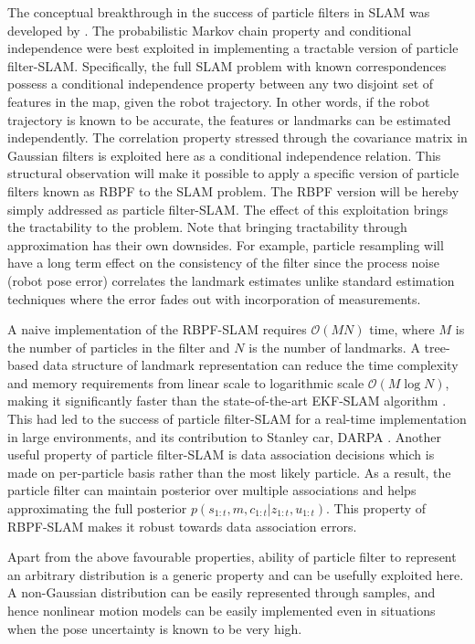 The conceptual breakthrough in the success of particle filters in SLAM was developed by \cite{montemerlo2002fastslam}. The probabilistic Markov chain property and conditional independence were best exploited in implementing a tractable version of particle filter-SLAM. Specifically, the full SLAM problem with known correspondences possess a conditional independence property between any two disjoint set of features in the map, given the robot trajectory. In other words, if the robot trajectory is known to be accurate, the features or landmarks can be estimated independently. The correlation property stressed through the covariance matrix in Gaussian filters is exploited here as a conditional independence relation. This structural observation will make it possible to apply a specific version of particle filters known as \acf{RBPF} to the SLAM problem. The RBPF version will be hereby simply addressed as particle filter-SLAM. The effect of this exploitation brings the tractability to the problem. Note that bringing tractability through approximation has their own downsides. For example, particle resampling will have a long term effect on the consistency of the filter \cite{bailey2006consistency} since the process noise (robot pose error) correlates the landmark estimates unlike standard estimation techniques where the error fades out with incorporation of measurements.

A naive implementation of the RBPF-SLAM requires $\mathcal{O}(MN)$ time, where $M$ is the number of particles in the filter and $N$ is the number of landmarks. A tree-based data structure of landmark representation can reduce the time complexity and memory requirements from linear scale to logarithmic scale $\mathcal{O}(M\log N)$, making it significantly faster than the state-of-the-art EKF-SLAM algorithm \cite{huang2011observability}. This had led to the success of particle filter-SLAM for a real-time implementation in large environments, and its contribution to Stanley car, DARPA \cite{thrun2006stanley}. Another useful property of particle filter-SLAM is data association decisions which is made on per-particle basis rather than the most likely particle. As a result, the particle filter can maintain posterior over multiple associations and helps approximating the full posterior $p(s_{1:t},m,c_{1:t}|z_{1:t},u_{1:t})$. This property of RBPF-SLAM makes it robust towards data association errors. 

Apart from the above favourable properties, ability of particle filter to represent an arbitrary distribution is a generic property and can be usefully exploited here. A non-Gaussian distribution can be easily represented through samples, and hence nonlinear motion models can be easily implemented even in situations when the pose uncertainty is known to be very high. 

